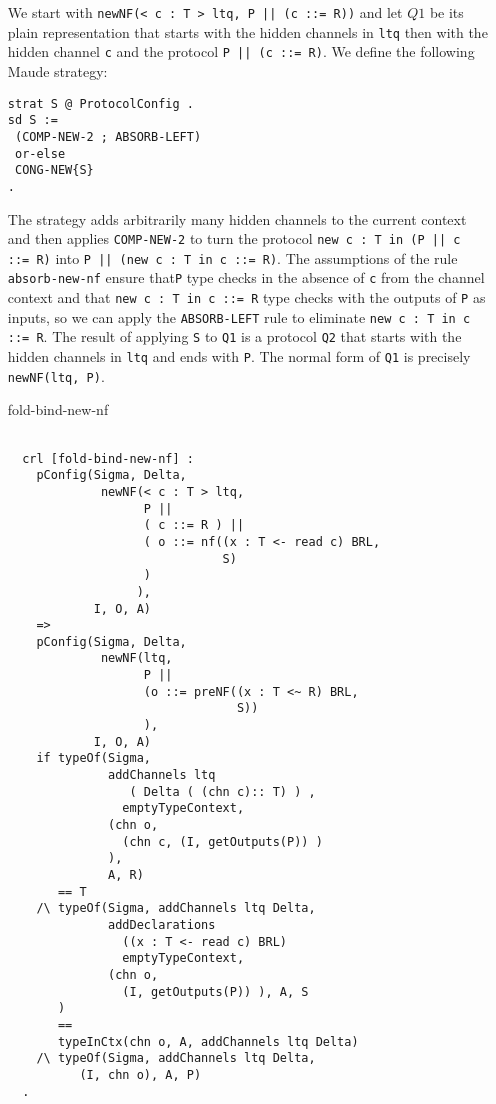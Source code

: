 \documentclass{article}
\begin{document}
\begin{itemize}
We start with 
\verb+newNF(< c : T > ltq, P || (c ::= R))+  
and let $Q1$ be its plain representation that starts with
the hidden channels in \verb+ltq+ then with the hidden channel \verb+c+ and
the protocol \verb+P || (c ::= R)+.
We define the following Maude strategy:
\begin{lstlisting}
strat S @ ProtocolConfig .
sd S := 
 (COMP-NEW-2 ; ABSORB-LEFT)
 or-else
 CONG-NEW{S}
.
\end{lstlisting}

 The strategy adds arbitrarily many hidden channels to the current context
 and then applies \verb+COMP-NEW-2+ to turn the protocol
 \verb+new c : T in (P || c ::= R)+ into
 \verb+P || (new c : T in c ::= R)+. The assumptions of the
 rule \verb+absorb-new-nf+ ensure that\verb+P+ type checks in the absence of
 \verb+c+ from the channel context and that 
 \verb+new c : T in c ::= R+ type checks with the outputs of \verb+P+
 as inputs, so we can apply the \verb+ABSORB-LEFT+ rule to eliminate
 \verb+new c : T in c ::= R+. The result of applying 
 \verb+S+ to \verb+Q1+ is a protocol \verb+Q2+ that starts with 
 the hidden channels in \verb+ltq+ and ends with \verb+P+.
 The normal form of \verb+Q1+ is precisely \verb+newNF(ltq, P)+.
 
\item[fold-bind-new-nf]
 \begin{lstlisting}
           
  crl [fold-bind-new-nf] :
    pConfig(Sigma, Delta, 
             newNF(< c : T > ltq, 
                   P || 
                   ( c ::= R ) || 
                   ( o ::= nf((x : T <- read c) BRL, 
                              S) 
                   )
                  ),
            I, O, A)
    => 
    pConfig(Sigma, Delta, 
             newNF(ltq, 
                   P || 
                   (o ::= preNF((x : T <~ R) BRL, 
                                S))
                   ),
            I, O, A) 
    if typeOf(Sigma, 
              addChannels ltq 
                 ( Delta ( (chn c):: T) ) , 
                emptyTypeContext, 
              (chn o, 
                (chn c, (I, getOutputs(P)) ) 
              ), 
              A, R) 
       == T 
    /\ typeOf(Sigma, addChannels ltq Delta, 
              addDeclarations 
                ((x : T <- read c) BRL) 
                emptyTypeContext,
              (chn o, 
                (I, getOutputs(P)) ), A, S
       ) 
       == 
       typeInCtx(chn o, A, addChannels ltq Delta)   
    /\ typeOf(Sigma, addChannels ltq Delta, 
          (I, chn o), A, P)     
  .
    \end{lstlisting}
    

\end{itemize}
\end{document}
